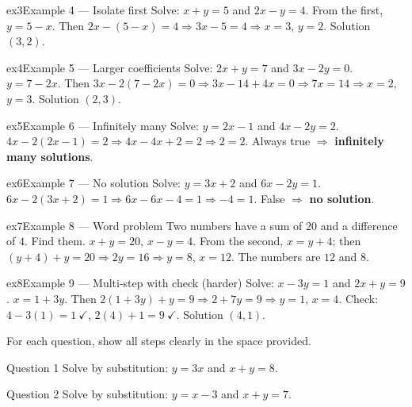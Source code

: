 \documentclass[11pt]{article}
\begin{document}
\begin{example}{ex3}{Example 4 --- Isolate first}
Solve: $x+y=5$ and $2x-y=4$.
\soln From the first, $y=5-x$. Then $2x-(5-x)=4\Rightarrow 3x-5=4\Rightarrow x=3$, $y=2$. Solution $(3,2)$.
\end{example}

\begin{example}{ex4}{Example 5 --- Larger coefficients}
Solve: $2x+y=7$ and $3x-2y=0$.
\soln $y=7-2x$. Then $3x-2(7-2x)=0\Rightarrow 3x-14+4x=0\Rightarrow 7x=14\Rightarrow x=2$, $y=3$. Solution $(2,3)$.
\end{example}

\begin{example}{ex5}{Example 6 --- Infinitely many}
Solve: $y=2x-1$ and $4x-2y=2$.
\soln $4x-2(2x-1)=2\Rightarrow 4x-4x+2=2\Rightarrow 2=2$. Always true $\Rightarrow$ \textbf{infinitely many solutions}.
\end{example}

\begin{example}{ex6}{Example 7 --- No solution}
Solve: $y=3x+2$ and $6x-2y=1$.
\soln $6x-2(3x+2)=1\Rightarrow 6x-6x-4=1\Rightarrow -4=1$. False $\Rightarrow$ \textbf{no solution}.
\end{example}

\begin{example}{ex7}{Example 8 --- Word problem}
Two numbers have a sum of $20$ and a difference of $4$. Find them.
\soln $x+y=20$, $x-y=4$. From the second, $x=y+4$; then $(y+4)+y=20\Rightarrow 2y=16\Rightarrow y=8$, $x=12$. The numbers are $12$ and $8$.
\end{example}

\begin{example}{ex8}{Example 9 --- Multi-step with check (harder)}
Solve: $x-3y=1$ and $2x+y=9$.
\soln $x=1+3y$. Then $2(1+3y)+y=9\Rightarrow 2+7y=9\Rightarrow y=1$, $x=4$. Check: $4-3(1)=1\ \checkmark$, $2(4)+1=9\ \checkmark$. Solution $(4,1)$.
\end{example}

\clearpage
{}
For each question, show all steps clearly in the space provided.

\begin{qbox}{Question 1}
Solve by substitution: $y=3x$ and $x+y=8$.\workspace{2.4cm}
\end{qbox}

\begin{qbox}{Question 2}
Solve by substitution: $y=x-3$ and $x+y=7$.\workspace{2.4cm}
\end{qbox}
\end{document}
